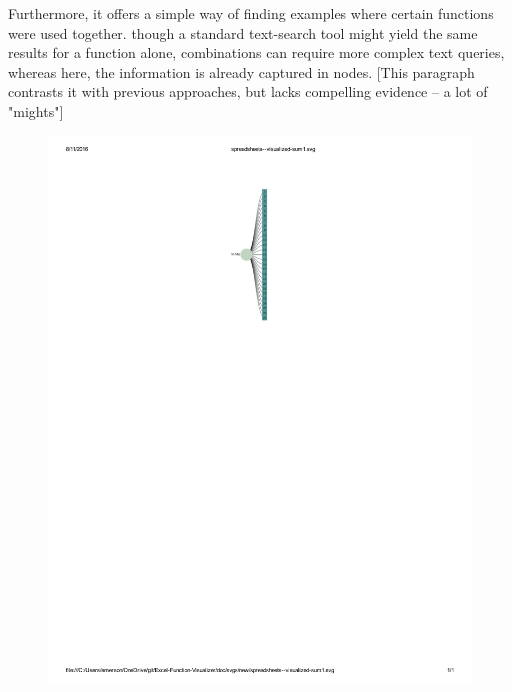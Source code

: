 \documentclass[conference]{IEEEtran}
\begin{document}
	Furthermore, it offers a simple way of finding examples where certain functions
	were used together. though a standard text-search tool might yield the same
	results for a function alone, combinations can require more complex text
	queries, whereas here, the information is already captured in nodes. [This
	paragraph contrasts it with previous approaches, but lacks compelling evidence
	-- a lot of "mights"] \par
	
	\begin{figure} \centering \includegraphics{SUM}
		\label{fig:sum} \end{figure}
	
\end{document}
